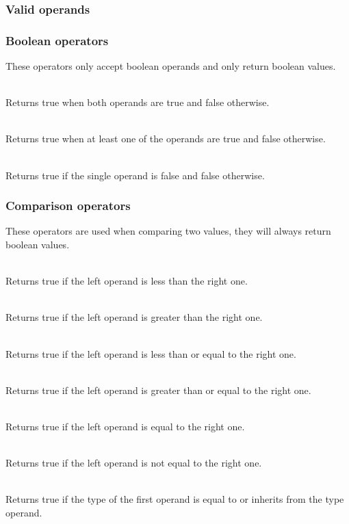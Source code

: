 \subsubsection{Valid operands}
\subsubsection{Boolean operators}

These operators only accept boolean operands and only return boolean values.
\begin{dlist}
  \item {}\\
    Returns true when both operands are true and false otherwise. 
  \item {}\\
    Returns true when at least one of the operands are true and false otherwise.
  \item {}\\
    Returns true if the single operand is false and false otherwise.
\end{dlist}

\subsubsection{Comparison operators}

These operators are used when comparing two values, they will always return
boolean values.
\begin{dlist}
  \item {}\\
    Returns true if the left operand is less than the right one.
  \item {}\\
    Returns true if the left operand is greater than the right one.
  \item {}\\
    Returns true if the left operand is less than or equal to the right one.
  \item {}\\
    Returns true if the left operand is greater than or equal to the right one.
  \item {}\\
    Returns true if the left operand is equal to the right one.
  \item {}\\
    Returns true if the left operand is not equal to the right one.
  \item {}\\
    Returns true if the type of the first operand is equal to or inherits from
    the type operand.
\end{dlist}

